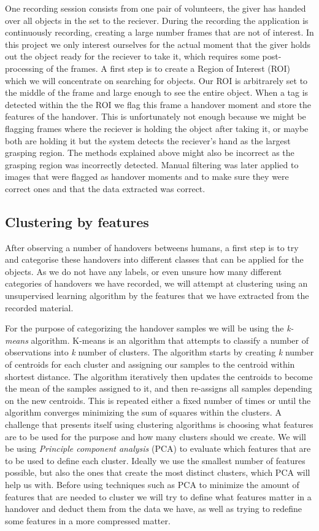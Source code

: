 One recording session consists from one pair of volunteers, the giver has handed over all objects in the set to the reciever. During the recording the application is continuously recording, creating a large number frames that are not of interest. In this project we only interest ourselves for the actual moment that the giver holds out the object ready for the reciever to take it, which requires some post-processing of the frames. A first step is to create a Region of Interest (ROI) which we will concentrate on searching for objects. Our ROI is arbitrarely set to the middle of the frame and large enough to see the entire object. When a tag is detected within the the ROI we flag this frame a handover moment and store the features of the handover. This is unfortunately not enough because we might be flagging frames where the reciever is holding the object after taking it, or maybe both are holding it but the system detects the reciever's hand as the largest grasping region. The methods explained above might also be incorrect as the grasping region was incorrectly detected. Manual filtering was later applied to images that were flagged as handover moments and to make sure they were correct ones and that the data extracted was correct.

\subsection{Clustering by features}

After observing a number of handovers betweens humans, a first step is to try and categorise these handovers into different classes that can be applied for the objects. As we do not have any labels, or even unsure how many different categories of handovers we have recorded, we will attempt at clustering using an unsupervised learning algorithm by the features that we have extracted from the recorded material.

For the purpose of categorizing the handover samples we will be using the \emph{k-means} algorithm. K-means is an algorithm that attempts to classify a number of observations into \emph{k} number of clusters. The algorithm starts by creating \emph{k} number of centroids for each cluster and assigning our samples to the centroid within shortest distance. The algorithm iteratively then updates the centroids to become the mean of the samples assigned to it, and then re-assigns all samples depending on the new centroids. This is repeated either a fixed number of times or until the algorithm converges minimizing the sum of squares within the clusters. A challenge that presents itself using clustering algorithms is choosing what features are to be used for the purpose and how many clusters should we create. We will be using \emph{Principle component analysis} (PCA) to evaluate which features that are to be used to define each cluster. Ideally we use the smallest number of features possible, but also the ones that create the most distinct clusters, which PCA will help us with. Before using techniques such as PCA to minimize the amount of features that are needed to cluster we will try to define what features matter in a handover and deduct them from the data we have, as well as trying to redefine some features in a more compressed matter.


